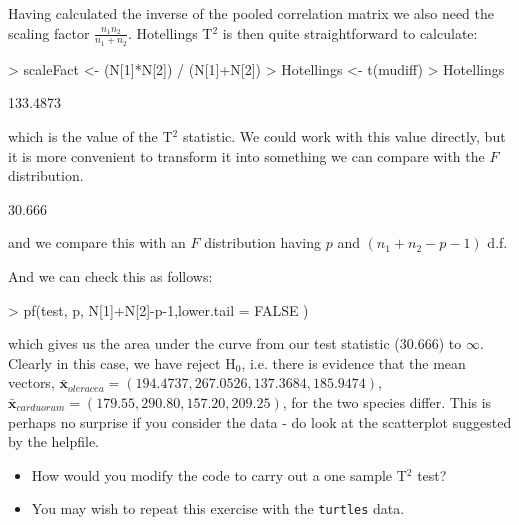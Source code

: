 \documentclass[11pt]{article}
\begin{document}
Having calculated the inverse of the pooled correlation matrix we also need the scaling factor $\frac{n_{1} n_{2}}{n_{1} + n_{2}}$.   Hotellings T$^{2}$ is then quite straightforward to calculate:


\begin{Schunk}
\begin{Sinput}
> scaleFact <- (N[1]*N[2]) / (N[1]+N[2])
> Hotellings <-  t(mudiff) %
> Hotellings
\end{Sinput}
\begin{Soutput}
         [,1]
[1,] 133.4873
\end{Soutput}
\end{Schunk}


which is the value of the T$^{2}$ statistic.   We could work with this value directly, but it is more convenient to transform it into something we can compare with the $F$ distribution.

\begin{Schunk}
\begin{Soutput}
       [,1]
[1,] 30.666
\end{Soutput}
\end{Schunk}


and we compare this with an $F$ distribution having $p$ and $(n_{1} + n_{2} - p - 1)$ d.f.

And we can check this as follows:

\begin{Schunk}
\begin{Sinput}
> pf(test, p, N[1]+N[2]-p-1,lower.tail = FALSE )
\end{Sinput}
\end{Schunk}

which gives us the area under the curve from our test statistic ($30.666$) to $\infty$.   Clearly in this case, we have reject H$_{0}$, i.e. there is evidence that the mean vectors, $\bar{\boldsymbol{x}}_{oleracea} = (194.4737, 267.0526, 137.3684, 185.9474)$, $\bar{\boldsymbol{x}}_{carduorum} = (179.55, 290.80, 157.20, 209.25)$, 
 for the two species differ.   This is perhaps no surprise if you consider the data - do look at the scatterplot suggested by the helpfile.

\begin{itemize}
\item How would you modify the code to carry out a one sample T$^{2}$ test?
\item You may wish to repeat this exercise with the \texttt{turtles} data.   
\end{itemize}
\end{document}
